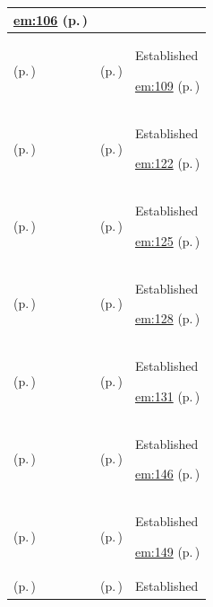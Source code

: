 \begin{longtable}{|>{\raggedright\arraybackslash}p{0.27\TableWidth}|>{\raggedright\arraybackslash}p{0.27\TableWidth}|>{\raggedright\arraybackslash}p{0.46\TableWidth}|}
 \hyperref[rad:em:86]{em:106} (p.\,\pageref{rad:em:86})\\\hline
\nameref{service:clinical-privilege-verification} (p.\,\pageref{service:clinical-privilege-verification}) & \nameref{feature:feat-em-16} (p.\,\pageref{feature:feat-em-16}) & Established

 \hyperref[rad:em:86]{em:109} (p.\,\pageref{rad:em:86})\\\hline
\nameref{service:organisation-verification-service} (p.\,\pageref{service:organisation-verification-service}) & \nameref{feature:feat-em-17} (p.\,\pageref{feature:feat-em-17}) & Established

 \hyperref[rad:em:118]{em:122} (p.\,\pageref{rad:em:118})\\\hline
\nameref{service:organisation-directory-query} (p.\,\pageref{service:organisation-directory-query}) & \nameref{feature:feat-em-18} (p.\,\pageref{feature:feat-em-18}) & Established

 \hyperref[rad:em:118]{em:125} (p.\,\pageref{rad:em:118})\\\hline
\nameref{service:organisational-hierarchy-resolution} (p.\,\pageref{service:organisational-hierarchy-resolution}) & \nameref{feature:feat-em-19} (p.\,\pageref{feature:feat-em-19}) & Established

 \hyperref[rad:em:118]{em:128} (p.\,\pageref{rad:em:118})\\\hline
\nameref{service:organisation-contact-lookup} (p.\,\pageref{service:organisation-contact-lookup}) & \nameref{feature:feat-em-20} (p.\,\pageref{feature:feat-em-20}) & Established

 \hyperref[rad:em:118]{em:131} (p.\,\pageref{rad:em:118})\\\hline
\nameref{service:location-directory-query} (p.\,\pageref{service:location-directory-query}) & \nameref{feature:feat-em-21} (p.\,\pageref{feature:feat-em-21}) & Established

 \hyperref[rad:em:140]{em:146} (p.\,\pageref{rad:em:140})\\\hline
\nameref{service:location-hierarchy-resolution} (p.\,\pageref{service:location-hierarchy-resolution}) & \nameref{feature:feat-em-22} (p.\,\pageref{feature:feat-em-22}) & Established

 \hyperref[rad:em:140]{em:149} (p.\,\pageref{rad:em:140})\\\hline
\nameref{service:care-place-specification-lookup} (p.\,\pageref{service:care-place-specification-lookup}) & \nameref{feature:feat-em-23} (p.\,\pageref{feature:feat-em-23}) & Established


\end{longtable}
